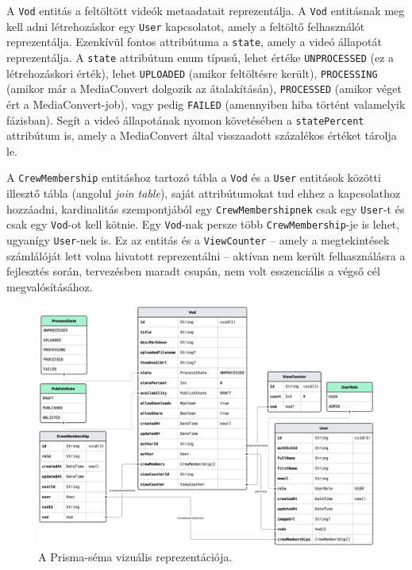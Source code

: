 A \verb|Vod| entitás a feltöltött videók metaadatait reprezentálja. A \verb|Vod| entitásnak meg kell adni létrehozáskor egy \verb|User| kapcsolatot, amely a feltöltő felhasználót reprezentálja. Ezenkívül fontos attribútuma a \verb|state|, amely a videó állapotát reprezentálja. A \verb|state| attribútum enum típusú, lehet értéke \verb|UNPROCESSED| (ez a létrehozáskori érték), lehet \verb|UPLOADED| (amikor feltöltésre került), \verb|PROCESSING| (amikor már a MediaConvert dolgozik az átalakításán), \verb|PROCESSED| (amikor véget ért a MediaConvert-job), vagy pedig \verb|FAILED| (amennyiben hiba történt valamelyik fázisban). Segít a videó állapotának nyomon követésében a \verb|statePercent| attribútum is, amely a MediaConvert által visszaadott százalékos értéket tárolja le.

A \verb|CrewMembership| entitáshoz tartozó tábla a \verb|Vod| és a \verb|User| entitások közötti illesztő tábla (angolul \emph{join table}), saját attribútumokat tud ehhez a kapcsolathoz hozzáadni, kardinalitás szempontjából egy \verb|CrewMembershipnek| csak egy \verb|User|-t és csak egy \verb|Vod|-ot kell kötnie. Egy \verb|Vod|-nak persze több \verb|CrewMembership|-je is lehet, ugyanígy \verb|User|-nek is. Ez az entitás és a \verb|ViewCounter| -- amely a megtekintések számlálóját lett volna hivatott reprezentálni -- aktívan nem került felhasználásra a fejlesztés során, tervezésben maradt csupán, nem volt esszenciális a végső cél megvalósításához.

\begin{figure}[h]
  \centering
  \includegraphics[width=150mm, keepaspectratio]{figures/prismaliser.png}
  \caption{A Prisma-séma vizuális reprezentációja.}
  \label{fig:prismaliser}
\end{figure}

